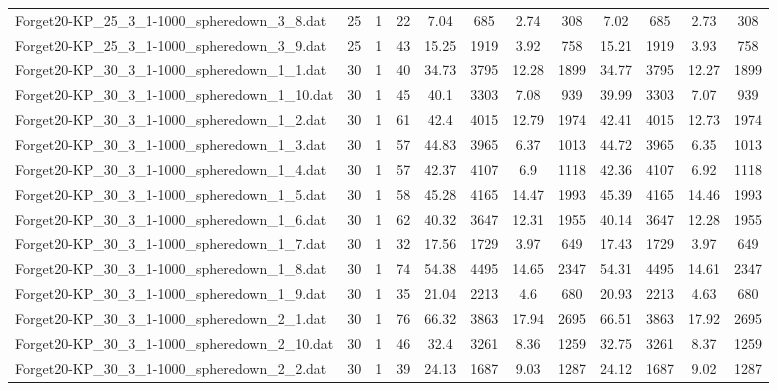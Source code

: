 \begin{sidewaystable}[!ht]
{\begin{tabular}{lccccccccccc}
Forget20-KP\_25\_3\_1-1000\_spheredown\_3\_8.dat & 25 & 1 & 22 & 7.04 & 685 & 2.74 & 308 & 7.02 & 685 &  \textcolor{blue2}{2.73} & 308 \\
Forget20-KP\_25\_3\_1-1000\_spheredown\_3\_9.dat & 25 & 1 & 43 & 15.25 & 1919 &  \textcolor{blue2}{3.92} & 758 & 15.21 & 1919 & 3.93 & 758 \\
Forget20-KP\_30\_3\_1-1000\_spheredown\_1\_1.dat & 30 & 1 & 40 & 34.73 & 3795 & 12.28 & 1899 & 34.77 & 3795 &  \textcolor{blue2}{12.27} & 1899 \\
Forget20-KP\_30\_3\_1-1000\_spheredown\_1\_10.dat & 30 & 1 & 45 & 40.1 & 3303 & 7.08 & 939 & 39.99 & 3303 &  \textcolor{blue2}{7.07} & 939 \\
Forget20-KP\_30\_3\_1-1000\_spheredown\_1\_2.dat & 30 & 1 & 61 & 42.4 & 4015 & 12.79 & 1974 & 42.41 & 4015 &  \textcolor{blue2}{12.73} & 1974 \\
Forget20-KP\_30\_3\_1-1000\_spheredown\_1\_3.dat & 30 & 1 & 57 & 44.83 & 3965 & 6.37 & 1013 & 44.72 & 3965 &  \textcolor{blue2}{6.35} & 1013 \\
Forget20-KP\_30\_3\_1-1000\_spheredown\_1\_4.dat & 30 & 1 & 57 & 42.37 & 4107 &  \textcolor{blue2}{6.9} & 1118 & 42.36 & 4107 & 6.92 & 1118 \\
Forget20-KP\_30\_3\_1-1000\_spheredown\_1\_5.dat & 30 & 1 & 58 & 45.28 & 4165 & 14.47 & 1993 & 45.39 & 4165 &  \textcolor{blue2}{14.46} & 1993 \\
Forget20-KP\_30\_3\_1-1000\_spheredown\_1\_6.dat & 30 & 1 & 62 & 40.32 & 3647 & 12.31 & 1955 & 40.14 & 3647 &  \textcolor{blue2}{12.28} & 1955 \\
Forget20-KP\_30\_3\_1-1000\_spheredown\_1\_7.dat & 30 & 1 & 32 & 17.56 & 1729 &  \textcolor{blue2}{3.97} & 649 & 17.43 & 1729 &  \textcolor{blue2}{3.97} & 649 \\
Forget20-KP\_30\_3\_1-1000\_spheredown\_1\_8.dat & 30 & 1 & 74 & 54.38 & 4495 & 14.65 & 2347 & 54.31 & 4495 &  \textcolor{blue2}{14.61} & 2347 \\
Forget20-KP\_30\_3\_1-1000\_spheredown\_1\_9.dat & 30 & 1 & 35 & 21.04 & 2213 &  \textcolor{blue2}{4.6} & 680 & 20.93 & 2213 & 4.63 & 680 \\
Forget20-KP\_30\_3\_1-1000\_spheredown\_2\_1.dat & 30 & 1 & 76 & 66.32 & 3863 & 17.94 & 2695 & 66.51 & 3863 &  \textcolor{blue2}{17.92} & 2695 \\
Forget20-KP\_30\_3\_1-1000\_spheredown\_2\_10.dat & 30 & 1 & 46 & 32.4 & 3261 &  \textcolor{blue2}{8.36} & 1259 & 32.75 & 3261 & 8.37 & 1259 \\
Forget20-KP\_30\_3\_1-1000\_spheredown\_2\_2.dat & 30 & 1 & 39 & 24.13 & 1687 & 9.03 & 1287 & 24.12 & 1687 &  \textcolor{blue2}{9.02} & 1287 \\

\end{tabular}}
\end{sidewaystable}
